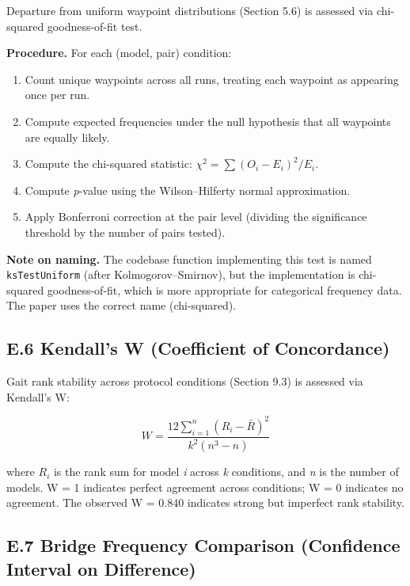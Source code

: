 Departure from uniform waypoint distributions (Section 5.6) is assessed via chi-squared goodness-of-fit test.

\textbf{Procedure.} For each (model, pair) condition:

\begin{enumerate}
\def\labelenumi{\arabic{enumi}.}
\tightlist
\item
  Count unique waypoints across all runs, treating each waypoint as appearing once per run.
\item
  Compute expected frequencies under the null hypothesis that all waypoints are equally likely.
\item
  Compute the chi-squared statistic: \(\chi^2 = \sum (O_i - E_i)^2 / E_i\).
\item
  Compute \emph{p}-value using the Wilson--Hilferty normal approximation.
\item
  Apply Bonferroni correction at the pair level (dividing the significance threshold by the number of pairs tested).
\end{enumerate}

\textbf{Note on naming.} The codebase function implementing this test is named \texttt{ksTestUniform} (after Kolmogorov--Smirnov), but the implementation is chi-squared goodness-of-fit, which is more appropriate for categorical frequency data. The paper uses the correct name (chi-squared).

\subsection{E.6 Kendall's W (Coefficient of Concordance)}\label{e.6-kendalls-w-coefficient-of-concordance}

Gait rank stability across protocol conditions (Section 9.3) is assessed via Kendall's W:

\[W = \frac{12 \sum_{i=1}^{n} (R_i - \bar{R})^2}{k^2(n^3 - n)}\]

where \(R_i\) is the rank sum for model \emph{i} across \emph{k} conditions, and \emph{n} is the number of models. W = 1 indicates perfect agreement across conditions; W = 0 indicates no agreement. The observed W = 0.840 indicates strong but imperfect rank stability.

\subsection{E.7 Bridge Frequency Comparison (Confidence Interval on Difference)}\label{e.7-bridge-frequency-comparison-confidence-interval-on-difference}

